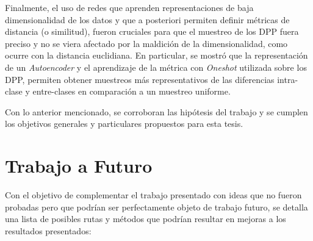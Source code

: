 \vspace{0.2cm}

Finalmente, el uso de redes que aprenden representaciones de baja dimensionalidad de los datos y que a posteriori permiten definir métricas de distancia (o similitud), fueron cruciales para que el muestreo de los DPP fuera preciso y no se viera afectado por la maldición de la dimensionalidad, como ocurre con la distancia euclidiana. En particular, se mostró que la representación de un \textit{Autoencoder} y el aprendizaje de la métrica con \textit{Oneshot} utilizada sobre los DPP, permiten obtener muestreos más representativos de las diferencias intra-clase y entre-clases en comparación a un muestreo uniforme. 

\vspace{0.2cm}

Con lo anterior mencionado, se corroboran las hipótesis del trabajo y se cumplen los objetivos generales y particulares propuestos para esta tesis. 

\section{Trabajo a Futuro}

Con el objetivo de complementar el trabajo presentado con ideas que no fueron probadas pero que podrían ser perfectamente objeto de trabajo futuro, se detalla una lista de posibles rutas y métodos que podrían resultar en mejoras a los resultados presentados:

